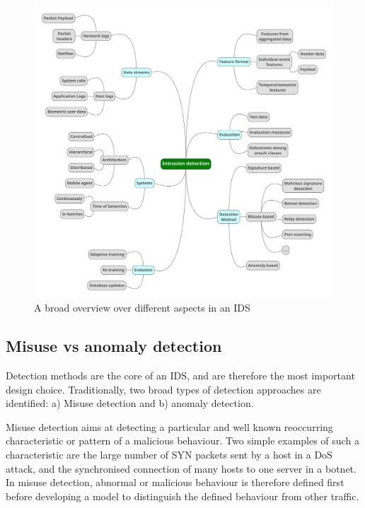 \begin{figure}
\centering
\includegraphics[width=\textwidth]{images/Graphic2.pdf}
\caption{A broad overview over different aspects in an IDS}\label{graph}
\end{figure}



\subsection{Misuse vs  anomaly detection}

Detection methods are the core of an IDS, and are therefore the most important design choice. Traditionally, two broad types of detection approaches are identified: a) Misuse detection and b) anomaly detection. 

Misuse detection aims at detecting a particular and well known reoccurring characteristic or pattern of a malicious behaviour. Two simple examples of such a characteristic are the large number of SYN packets sent by a host in a DoS attack, and the synchronised connection of many hosts to one server in a botnet. In misuse detection, abnormal or malicious behaviour is therefore defined first before developing a model to distinguish the defined behaviour from other traffic.

